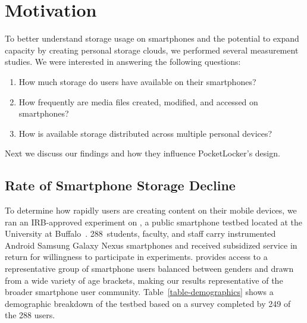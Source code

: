 
\section{Motivation}
\label{sec-motivation}

To better understand storage usage on smartphones and the potential to expand
capacity by creating personal storage clouds, we performed several
measurement studies. We were interested in answering the following questions:

\begin{enumerate}

\item How much storage do users have available on their smartphones?

\item How frequently are media files created, modified, and accessed on
smartphones?

\item How is available storage distributed across multiple personal devices?

\end{enumerate}

Next we discuss our findings and how they influence PocketLocker's design.

\subsection{Rate of Smartphone Storage Decline}

To determine how rapidly users are creating content on their mobile devices,
we ran an IRB-approved experiment on \PhoneLab{}, a public smartphone testbed
located at the University at Buffalo~\cite{nandugudi2013phonelab}.
288~students, faculty, and staff carry instrumented Android Samsung Galaxy
Nexus smartphones and received subsidized service in return for willingness
to participate in experiments. \PhoneLab{} provides access to a
representative group of smartphone users balanced between genders and drawn
from a wide variety of age brackets, making our results representative of the
broader smartphone user community. Table~\ref{table-demographics} shows a
demographic breakdown of the testbed based on a survey completed by 249 of
the 288 \PhoneLab{} users.



